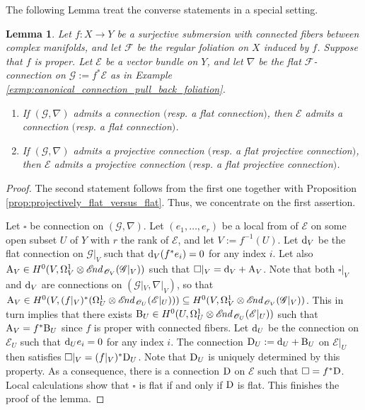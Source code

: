 \documentclass[english,10pt]{amsart}
\newcommand{\cF}{\mathcal{F}}
\newcommand{\sE}{\mathscr{E}}
\newcommand{\sG}{\mathscr{G}}
\newcommand{\sO}{\mathscr{O}}
\newcommand{\dd}{\textup{d}}
\newtheorem{lemma}[thm]{Lemma}
\theoremstyle{definition}
\theoremstyle{remark}
\numberwithin{equation}{section}
\begin{document}
The following Lemma treat the converse statements in a special setting.

\begin{lemma}\label{lemma:descent}
Let $f \colon X \to Y$ be a surjective submersion with connected fibers between complex manifolds, and let $\cF$ be the regular foliation on $X$ induced by $f$. Suppose that $f$ is proper. Let $\sE$ be a vector bundle on $Y$, and let $\nabla$ be the flat $\cF$-connection on $\sG:=f^*\sE$ as in Example \ref{exmp:canonical_connection_pull_back_foliation}. 
\begin{enumerate}
\item If $(\sG,\nabla)$ admits a connection $($resp. a flat connection$)$, then $\sE$ admits a connection $($resp. a flat connection$)$. 
\item If $(\sG,\nabla)$ admits a projective connection $($resp. a flat projective connection$)$, then $\sE$ admits a projective connection $($resp. a flat projective connection$)$. 
\end{enumerate}
\end{lemma}

\begin{proof}
The second statement follows from the first one together with Proposition \ref{prop:projectively_flat_versus_flat}. Thus, we concentrate on the first assertion. 

Let $\square$ be connection on $(\sG,\nabla)$. Let $(e_1,\ldots,e_r)$ be a local from of $\sE$ on some open subset $U$ of $Y$ with $r$ the rank of $\sE$, and let $V:=f^{-1}(U)$. Let $\dd_V$ be the flat connection on $\sG|_V$ such that $\dd_V (f^*e_i)=0$ for any index $i$. Let also $\textup{A}_V\in H^0(V,\Omega^1_V \otimes \sE\hspace{-0.07cm}\textit{nd}_{\,\sO_V}(\sG|_V))$ such that $\square|_V=\dd_V + \textup{A}_V$. Note that both $\square|_V$ and $\dd_V$ are connections on $(\sG|_V,\nabla|_V)$, so that
$\textup{A}_V\in H^0(V,(f|_V)^*(\Omega^1_U \otimes \sE\hspace{-0.07cm}\textit{nd}_{\,\sO_U}(\sE|_U))) \subseteq H^0(V,\Omega^1_V \otimes \sE\hspace{-0.07cm}\textit{nd}_{\,\sO_V}(\sG|_V))$. This in turn implies that there exists $\textup{B}_U\in H^0(U,\Omega^1_U \otimes \sE\hspace{-0.07cm}\textit{nd}_{\,\sO_U}(\sE|_U))$ such that $\textup{A}_V=f^*\textup{B}_U$ since $f$ is proper with connected fibers. Let $\dd_U$ be the connection on $\sE_U$ such that $\dd_U e_i = 0$ for any index $i$. The connection $\textup{D}_U:=\dd_U+\textup{B}_U$ on $\sE|_U$ then satisfies $\square|_V = (f|_V)^*\textup{D}_U$. Note that $\textup{D}_U$ is uniquely determined by this property. As a consequence, there is a connection $\textup{D}$ on $\sE$ such that $\square=f^*\textup{D}$. Local calculations show that $\square$ is flat if and only if $\textup{D}$ is flat. This finishes the proof of the lemma.
\end{proof}
\end{document}
